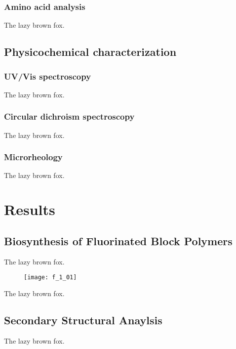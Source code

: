 \begin{refsection}
\subsubsection{Amino acid analysis}

The lazy brown fox.

\subsection{Physicochemical characterization}

\subsubsection{UV/Vis spectroscopy}

The lazy brown fox.

\subsubsection{Circular dichroism spectroscopy}

The lazy brown fox.

\subsubsection{Microrheology}

The lazy brown fox.

\section{Results}

\subsection{Biosynthesis of Fluorinated Block Polymers}

The lazy brown fox.

\begin{figure}[h!]
    \centering
    \texttt{[image: f\_1\_01]}
    \caption{}
    \label{fig:biosynthesis_report}
\end{figure}

The lazy brown fox.

\subsection{Secondary Structural Anaylsis}

The lazy brown fox.


\end{refsection}
